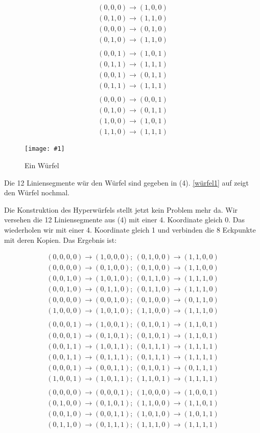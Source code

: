 \documentclass[10pt,a4paper,twoside,titlepage]{article}
\newcommand{\myeq}[2]{
	\begin{equation}
		\begin{split}
			#1
		\end{split}
		\label{#2}
	\end{equation}
}
\newcommand{\image}[4]{
	\begin{figure}[!ht]
		\centering
		\texttt{[image: \#1]}
		\caption{#2}
		\label{#3}
	\end{figure}
}
\begin{document}
\myeq{(0,0,0)\rightarrow(1,0,0)\\
	(0,1,0)\rightarrow(1,1,0)\\
	(0,0,0)\rightarrow(0,1,0)\\
	(0,1,0)\rightarrow(1,1,0)\\
	\\
	(0,0,1)\rightarrow(1,0,1)\\
	(0,1,1)\rightarrow(1,1,1)\\
	(0,0,1)\rightarrow(0,1,1)\\
	(0,1,1)\rightarrow(1,1,1)\\
	\\
	(0,0,0)\rightarrow(0,0,1)\\
	(0,1,0)\rightarrow(0,1,1)\\
	(1,0,0)\rightarrow(1,0,1)\\
	(1,1,0)\rightarrow(1,1,1)
}{würfel}

\image{img/wuerfel.eps}{Ein Würfel}{würfel1}{6}

Die 12 Liniensegmente wür den Würfel sind gegeben in (4). \autoref{würfel1} auf
 zeigt den Würfel nochmal.

Die Konstruktion des Hyperwürfels stellt jetzt kein Problem mehr da. Wir
versehen die 12 Liniensegmente aus (4) mit einer 4. Koordinate gleich 0.
Das wiederholen wir mit einer 4. Koordinate gleich 1 und verbinden die 8
Eckpunkte mit deren Kopien. Das Ergebnis ist:

\myeq{(0,0,0,0)\rightarrow(1,0,0,0);\
	(0,1,0,0)\rightarrow(1,1,0,0)\\
	(0,0,0,0)\rightarrow(0,1,0,0);\
	(0,1,0,0)\rightarrow(1,1,0,0)\\
	(0,0,1,0)\rightarrow(1,0,1,0);\
	(0,1,1,0)\rightarrow(1,1,1,0)\\
	(0,0,1,0)\rightarrow(0,1,1,0);\
	(0,1,1,0)\rightarrow(1,1,1,0)\\
	(0,0,0,0)\rightarrow(0,0,1,0);\
	(0,1,0,0)\rightarrow(0,1,1,0)\\
	(1,0,0,0)\rightarrow(1,0,1,0);\
	(1,1,0,0)\rightarrow(1,1,1,0)\\
	\\
	(0,0,0,1)\rightarrow(1,0,0,1);\
	(0,1,0,1)\rightarrow(1,1,0,1)\\
	(0,0,0,1)\rightarrow(0,1,0,1);\
	(0,1,0,1)\rightarrow(1,1,0,1)\\
	(0,0,1,1)\rightarrow(1,0,1,1);\
	(0,1,1,1)\rightarrow(1,1,1,1)\\
	(0,0,1,1)\rightarrow(0,1,1,1);\
	(0,1,1,1)\rightarrow(1,1,1,1)\\
	(0,0,0,1)\rightarrow(0,0,1,1);\
	(0,1,0,1)\rightarrow(0,1,1,1)\\
	(1,0,0,1)\rightarrow(1,0,1,1);\
	(1,1,0,1)\rightarrow(1,1,1,1)\\
	\\
	(0,0,0,0)\rightarrow(0,0,0,1);\
	(1,0,0,0)\rightarrow(1,0,0,1)\\
	(0,1,0,0)\rightarrow(0,1,0,1);\
	(1,1,0,0)\rightarrow(1,1,0,1)\\
	(0,0,1,0)\rightarrow(0,0,1,1);\
	(1,0,1,0)\rightarrow(1,0,1,1)\\
	(0,1,1,0)\rightarrow(0,1,1,1);\
	(1,1,1,0)\rightarrow(1,1,1,1)
}{hyperw}
\end{document}
